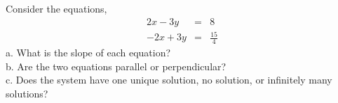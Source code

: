 \documentclass{ximera}
\author{Parisa Fatheddin}
\begin{document}
\begin{exercise}


Consider the equations, 
\begin{eqnarray*}
2x-3y &=& 8\\
-2x +3y &=& \frac{15}{4}
\end{eqnarray*}
a. What is the slope of each equation? \\
b. Are the two equations parallel or perpendicular? \\
c. Does the system have one unique solution, no solution, or infinitely many solutions?

























\end{exercise}
\end{document}
